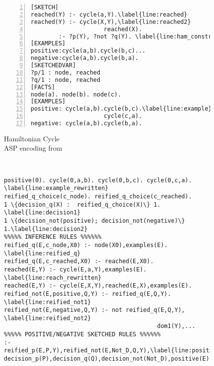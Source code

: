 \newcommand{\rulesep}{\unskip\ \vrule\ }
\newcommand{\hrulesep}{\unskip\ \hrule\ }

\begin{figure*}[htb]
\begin{subfigure}[t]{0.348\textwidth}
  \renewcommand{\figurename}{Listing}
  \vspace{3pt}
  \begin{Verbatim}[fontsize=\scriptsize,numbers=left,xleftmargin=-2mm,commandchars=\\\{\}]
[SKETCH]
reached(Y) :- cycle(a,Y).\label{line:reached}
reached(Y) :- cycle(X,Y),\label{line:reached2}
                     reached(X).
        :- ?p(Y), ?not ?q(Y). \label{line:ham_constraint}
[EXAMPLES]
positive:cycle(a,b).cycle(b,c)...
negative:cycle(a,b).cycle(b,a).
[SKETCHEDVAR]
?p/1 : node, reached
?q/1 : node, reached
[FACTS]
node(a). node(b). node(c).
[EXAMPLES]
positive: cycle(a,b).cycle(b,c).\label{line:example}
                     cycle(c,a).
negative: cycle(a,b).cycle(b,a).
\end{Verbatim}
\caption{Hamiltonian Cycle\\ASP encoding from\\ \protect\parencite{ASPbook}} \label{lst:ham}
\end{subfigure}
\rulesep
\begin{subfigure}[t]{0.645\textwidth}
  \vspace{3pt}
  \renewcommand{\figurename}{Sketch}
  \begin{Verbatim}[fontsize=\scriptsize,commandchars=\\\{\}]
%%%%% EXAMPLES AND DECISIONS %%%%%%
positive(0). cycle(0,a,b). cycle(0,b,c). cycle(0,c,a). \label{line:example_rewritten}
reified_q_choice(c_node). reified_q_choice(c_reached).
1 \{decision_q(X) :  reified_q_choice(X)\} 1. \label{line:decision1}
1 \{decision_not(positive); decision_not(negative)\} 1.\label{line:decision2}
%%%%% INFERENCE RULES %%%%%%
reified_q(E,c_node,X0) :- node(X0),examples(E). \label{line:reified_q}
reified_q(E,c_reached,X0) :- reached(E,X0).
reached(E,Y) :- cycle(E,a,Y),examples(E). \label{line:reach_rewritten}
reached(E,Y) :- cycle(E,X,Y),reached(E,X),examples(E).
reified_not(E,positive,Q,Y) :- reified_q(E,Q,Y). \label{line:reified_not1}
reified_not(E,negative,Q,Y) :- not reified_q(E,Q,Y), \label{line:reified_not2}
                                            dom1(Y),...
%%%%% POSITIVE/NEGATIVE SKETCHED RULES %%%%%%
:- reified_p(E,P,Y),reified_not(E,Not_D,Q,Y),\label{line:positive_rewritten1}
decision_p(P),decision_q(Q),decision_not(Not_D),positive(E).\label{line:positive_rewritten2}

\end{Verbatim}
\end{subfigure}
\end{figure*}
